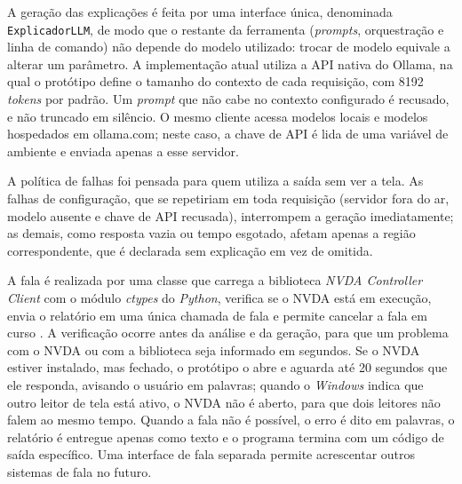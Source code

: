 \documentclass[
    12pt,                   %
    openright,              %
    oneside,                %
    a4paper,                %
    sumario=tradicional,    %
    english,                %
    brazil,                 %
    ]{abntex2}
\begin{document}
A geração das explicações é feita por uma interface única, denominada \texttt{Explicador\-LLM}, de modo que o restante da ferramenta (\textit{prompts}, orquestração e linha de comando) não depende do modelo utilizado: trocar de modelo equivale a alterar um parâmetro. A implementação atual utiliza a API nativa do Ollama, na qual o protótipo define o tamanho do contexto de cada requisição, com 8192 \textit{tokens} por padrão. Um \textit{prompt} que não cabe no contexto configurado é recusado, e não truncado em silêncio. O mesmo cliente acessa modelos locais e modelos hospedados em ollama.com; neste caso, a chave de API é lida de uma variável de ambiente e enviada apenas a esse servidor.

A política de falhas foi pensada para quem utiliza a saída sem ver a tela. As falhas de configuração, que se repetiriam em toda requisição (servidor fora do ar, modelo ausente e chave de API recusada), interrompem a geração imediatamente; as demais, como resposta vazia ou tempo esgotado, afetam apenas a região correspondente, que é declarada sem explicação em vez de omitida.

A fala é realizada por uma classe que carrega a biblioteca \textit{NVDA Controller Client} com o módulo \textit{ctypes} do \textit{Python}, verifica se o NVDA está em execução, envia o relatório em uma única chamada de fala e permite cancelar a fala em curso \cite{nvaccess2024controller}. A verificação ocorre antes da análise e da geração, para que um problema com o NVDA ou com a biblioteca seja informado em segundos. Se o NVDA estiver instalado, mas fechado, o protótipo o abre e aguarda até 20 segundos que ele responda, avisando o usuário em palavras; quando o \textit{Windows} indica que outro leitor de tela está ativo, o NVDA não é aberto, para que dois leitores não falem ao mesmo tempo. Quando a fala não é possível, o erro é dito em palavras, o relatório é entregue apenas como texto e o programa termina com um código de saída específico. Uma interface de fala separada permite acrescentar outros sistemas de fala no futuro.
\end{document}
